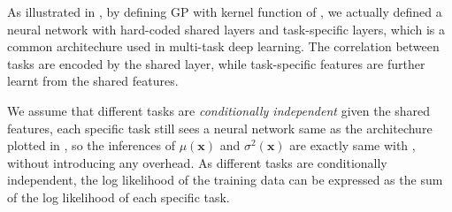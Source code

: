 As illustrated in , by defining GP with kernel function of , we actually defined a neural network with hard-coded shared layers and task-specific layers, which is a common architechure used in multi-task deep learning\cite{ruder2017overview}. The correlation between tasks are encoded by the shared layer, while task-specific features are further learnt from the shared features. 

We assume that different tasks are \emph{conditionally independent} given the shared features, each specific task still sees a neural network same as the architechure plotted in , so the inferences of $\mu(\bm{x})$ and $\sigma^2(\bm{x})$ are exactly same with , without introducing any overhead. As different tasks are conditionally independent, the log likelihood of the training data can be expressed as the sum of the log likelihood of each specific task.

